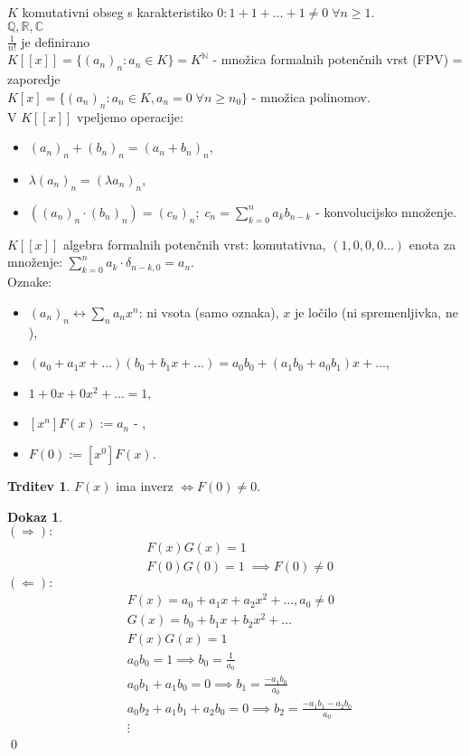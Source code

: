 \documentclass[a4paper, 12pt]{book}
\theoremstyle{definition}
\newtheorem{claim}[counter]{Trditev}
\newtheorem{pro}[counter]{Dokaz}
\theoremstyle{remark}
\newcommand{\N}{\mathbb{N}}
\newcommand{\Q}{\mathbb{Q}}
\newcommand{\R}{\mathbb{R}}
\newcommand{\C}{\mathbb{C}}
\begin{document}
$K$ komutativni obseg s karakteristiko $0: 1 + 1 + \dots + 1 \neq 0 \; \forall n \geq 1$. \\
$\Q, \R, \C$ \\
$\frac{1}{n!}$ je definirano \\
$K[[x]] = \{(a_n)_n: a_n \in K\} = K^{\N}$ - množica formalnih potenčnih vrst (FPV) = zaporedje \\
$K[x] = \{(a_n)_n: a_n \in K, a_n = 0 \; \forall n \geq n_0\}$ - množica polinomov. \\
V $K[[x]]$ vpeljemo operacije:
\begin{itemize}[label={}]
  \item $(a_n)_n + (b_n)_n = (a_n + b_n)_n$,
  \item $\lambda (a_n)_n = (\lambda a_n)_n$,
  \item $((a_n)_n \cdot (b_n)_n) = (c_n)_n; \; c_n = \sum_{k=0}^{n} a_k b_{n-k}$ - konvolucijsko množenje.
\end{itemize}
$K[[x]]$ algebra formalnih potenčnih vrst: komutativna, $(1,0,0,0 \dots)$ enota za množenje:
$\sum_{k=0}^{n} a_k \cdot \delta_{n-k,0} = a_n$. \\
Oznake:
\begin{itemize}[label={}]
  \item $(a_n)_n \leftrightarrow \sum_n a_n x^n$: ni vsota (samo oznaka), $x$ je ločilo (ni spremenljivka, ne ),
  \item $(a_0 + a_1x + \dots) (b_0 + b_1x + \dots) = a_0 b_0 + (a_1 b_0 + a_0 b_1) x + \dots$,
  \item $1 + 0x + 0x^2 + \dots = 1$,
  \item $[x^n] F(x) := a_n$ - ,
  \item $F(0) := [x^0] F(x)$.
\end{itemize}
\begin{claim}
  $F(x)$ ima inverz $\iff F(0) \neq 0$.
\end{claim}
\begin{pro} \text{} \\
  $(\Longrightarrow):$
  \begin{align*}
    &F(x) G(x) = 1 \\
    &F(0) G(0) = 1\; \implies F(0) \neq 0
  \end{align*}
  $(\Longleftarrow):$
  \begin{align*}
    &F(x) = a_0 + a_1x + a_2x^2 + \dots, a_0 \neq 0 \\
    &G(x) = b_0 + b_1x + b_2x^2 + \dots \\
    &F(x) G(x) = 1 \\
    &a_0 b_0 = 1 \implies b_0 = \frac{1}{a_0} \\
    &a_0 b_1 + a_1 b_0 = 0 \implies b_1 = \frac{-a_1 b_0}{a_0} \\
    &a_0 b_2 + a_1 b_1 + a_2 b_0 = 0 \implies b_2 = \frac{-a_1 b_1 - a_2 b_0}{a_0} \\
    &\vdots
  \end{align*}
  \qed
\end{pro}
\end{document}
